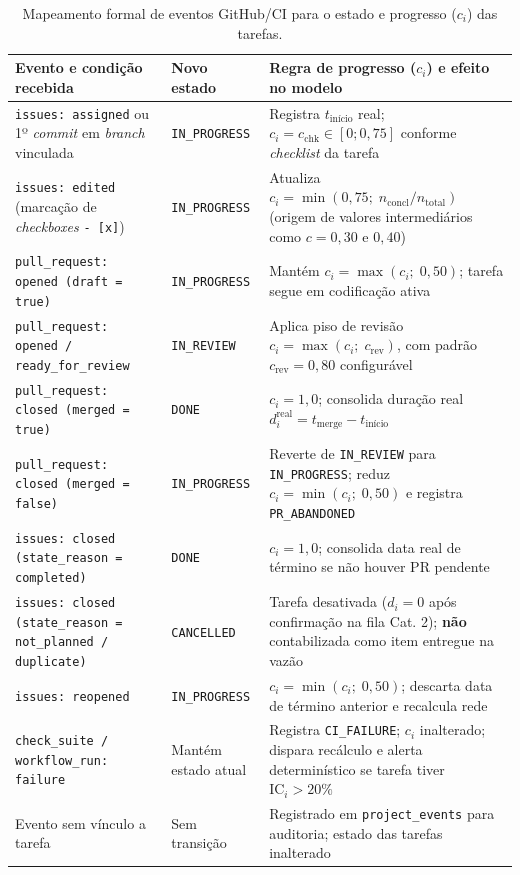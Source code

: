 \documentclass[12pt,openany,oneside,a4paper,english,brazilian,sumario=tradicional]{abntex2}
\newcommand{\fonteautores}{\par\vspace{1mm}{\small Fonte: Elaborado pelos autores (2026).}}
\newcommand{\IC}{\mathrm{IC}}
\begin{document}
\begin{table}[htbp]
\caption{Mapeamento formal de eventos GitHub/CI para o estado e progresso ($c_i$) das tarefas.}\label{tab:eventos}
\scriptsize
\begin{tabularx}{\textwidth}{L{4.3cm} L{2.9cm} Y}
\toprule
\textbf{Evento e condição recebida} & \textbf{Novo estado} & \textbf{Regra de progresso ($c_i$) e efeito no modelo}\\
\midrule
\texttt{issues: assigned} ou 1º \textit{commit} em \textit{branch} vinculada & \texttt{IN\_PROGRESS} & Registra $t_{\text{início}}$ real; $c_i = c_{\mathrm{chk}} \in [0; 0{,}75]$ conforme \textit{checklist} da tarefa\\
\texttt{issues: edited} (marcação de \textit{checkboxes} \texttt{- [x]}) & \texttt{IN\_PROGRESS} & Atualiza $c_i = \min(0{,}75;\; n_{\mathrm{concl}}/n_{\mathrm{total}})$ (origem de valores intermediários como $c=0{,}30$ e $0{,}40$)\\
\texttt{pull\_request: opened (draft = true)} & \texttt{IN\_PROGRESS} & Mantém $c_i = \max(c_i;\; 0{,}50)$; tarefa segue em codificação ativa\\
\texttt{pull\_request: opened / ready\_for\_review} & \texttt{IN\_REVIEW} & Aplica piso de revisão $c_i = \max(c_i;\; c_{\mathrm{rev}})$, com padrão $c_{\mathrm{rev}} = 0{,}80$ configurável\\
\texttt{pull\_request: closed (merged = true)} & \texttt{DONE} & $c_i = 1{,}0$; consolida duração real $d_i^{\mathrm{real}} = t_{\mathrm{merge}} - t_{\text{início}}$\\
\texttt{pull\_request: closed (merged = false)} & \texttt{IN\_PROGRESS} & Reverte de \texttt{IN\_REVIEW} para \texttt{IN\_PROGRESS}; reduz $c_i = \min(c_i;\; 0{,}50)$ e registra \texttt{PR\_ABANDONED}\\
\texttt{issues: closed (state\_reason = completed)} & \texttt{DONE} & $c_i = 1{,}0$; consolida data real de término se não houver PR pendente\\
\texttt{issues: closed (state\_reason = not\_planned / duplicate)} & \texttt{CANCELLED} & Tarefa desativada ($d_i = 0$ após confirmação na fila Cat. 2); \textbf{não} contabilizada como item entregue na vazão\\
\texttt{issues: reopened} & \texttt{IN\_PROGRESS} & $c_i = \min(c_i;\; 0{,}50)$; descarta data de término anterior e recalcula rede\\
\texttt{check\_suite / workflow\_run: failure} & Mantém estado atual & Registra \texttt{CI\_FAILURE}; $c_i$ inalterado; dispara recálculo e alerta determinístico se tarefa tiver $\IC_i > 20\%$\\
Evento sem vínculo a tarefa & Sem transição & Registrado em \texttt{project\_events} para auditoria; estado das tarefas inalterado\\
\bottomrule
\end{tabularx}
\fonteautores
\end{table}
\end{document}
